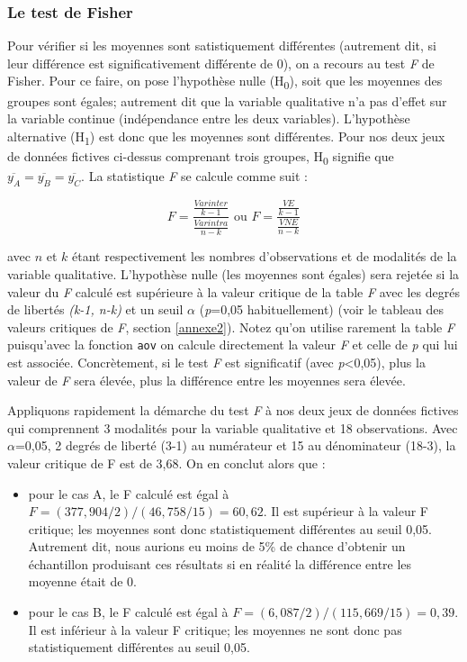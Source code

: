 \documentclass[
  11pt,
  french,
]{book}
\providecommand{\tightlist}{%
  \setlength{\itemsep}{0pt}\setlength{\parskip}{0pt}}
\begin{document}
\hypertarget{sect04412}{%
\subsubsection{Le test de Fisher}\label{sect04412}}

Pour vérifier si les moyennes sont satistiquement différentes (autrement dit, si leur différence est significativement différente de 0), on a recours au test \emph{F} de Fisher. Pour ce faire, on pose l'hypothèse nulle (H\textsubscript{0}), soit que les moyennes des groupes sont égales; autrement dit que la variable qualitative n'a pas d'effet sur la variable continue (indépendance entre les deux variables). L'hypothèse alternative (H\textsubscript{1}) est donc que les moyennes sont différentes. Pour nos deux jeux de données fictives ci-dessus comprenant trois groupes, H\textsubscript{0} signifie que \(\overline{y_{A}}=\overline{y_{B}}=\overline{y_{C}}\). La statistique \emph{F} se calcule comme suit :

\begin{equation} 
F = \frac{\frac{Var{inter}}{k-1}}{\frac{Var{intra}}{n-k}}\mbox{ ou } F = \frac{\frac{VE}{k-1}}{\frac{VNE}{n-k}}
\label{eq:anovaF}
\end{equation}

avec \(n\) et \(k\) étant respectivement les nombres d'observations et de modalités de la variable qualitative. L'hypothèse nulle (les moyennes sont égales) sera rejetée si la valeur du \emph{F} calculé est supérieure à la valeur critique de la table \emph{F} avec les degrés de libertés \emph{(k-1, n-k)} et un seuil
\(\alpha\) (\emph{p}=0,05 habituellement) (voir le tableau des valeurs critiques de \emph{F}, section \ref{annexe2}). Notez qu'on utilise rarement la table \emph{F} puisqu'avec la fonction \texttt{aov} on calcule directement la valeur \emph{F} et celle de \emph{p} qui lui est associée. Concrètement, si le test \emph{F} est significatif (avec \emph{p}\textless0,05), plus la valeur de \emph{F} sera élevée, plus la différence entre les moyennes sera élevée.

Appliquons rapidement la démarche du test \emph{F} à nos deux jeux de données fictives qui comprennent 3 modalités pour la variable qualitative et 18 observations. Avec \(\alpha\)=0,05, 2 degrés de liberté (3-1) au numérateur et 15 au dénominateur (18-3), la valeur critique de F est de 3,68. On en conclut alors que :

\begin{itemize}
\tightlist
\item
  pour le cas A, le F calculé est égal à \(F = (377,904 /2) / (46,758 / 15) = 60,62\). Il est supérieur à la valeur F critique; les moyennes sont donc statistiquement différentes au seuil 0,05. Autrement dit, nous aurions eu moins de 5\% de chance d'obtenir un échantillon produisant ces résultats si en réalité la différence entre les moyenne était de 0.
\item
  pour le cas B, le F calculé est égal à \(F = (6,087/2)/ (115,669 / 15) = 0,39\). Il est inférieur à la valeur F critique; les moyennes ne sont donc pas statistiquement différentes au seuil 0,05.
\end{itemize}
\end{document}
